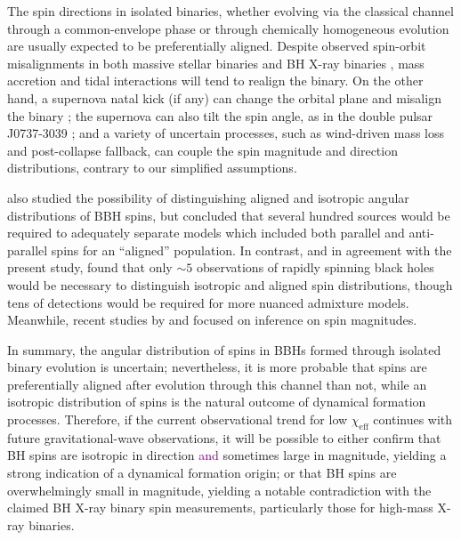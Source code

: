 \documentclass[modern,linenumbers]{aastex61}
\newcommand{\chieff}{\chi_\mathrm{eff}}
\newcommand{\ilya}[1]{\textcolor{purple}{#1}}
\begin{document}
The spin directions in isolated binaries, whether evolving via the
classical channel through a common-envelope phase
\citep{TutukovYungelson:1973,TutukovYungelson:1993,Lipunov:1997,2016Natur.534..512B,Stevenson:2017}
or through chemically homogeneous evolution
\citep{MandeldeMink:2016,Marchant:2016} are usually expected to be
preferentially aligned.  Despite observed spin-orbit misalignments in
both massive stellar binaries
\citep{Albrecht:2009,2014ApJ...785...83A} and BH X-ray binaries
\citep{Orosz:2001,Martin:2008b,Martin:2008,MorningstarMiller:2014},
mass accretion and tidal interactions will tend to realign the binary.
On the other hand, a supernova natal kick (if any) can change the
orbital plane and misalign the binary
\citep{2000ApJ...541..319K,2013PhRvD..87j4028G}; the supernova can
also tilt the spin angle, as in the double pulsar J0737-3039
\citep{2011ApJ...742...81F}; and a variety of uncertain processes,
such as wind-driven mass loss and post-collapse fallback, can couple
the spin magnitude and direction distributions, contrary to our
simplified assumptions.

\citet{2017CQGra..34cLT01V} also studied the possibility of
distinguishing aligned and isotropic angular distributions of \ac{BBH}
spins, but concluded that several hundred sources would be required to
adequately separate models which included both parallel and
anti-parallel spins for an ``aligned'' population.  In contrast, and
in agreement with the present study, \citet{Stevenson:2017spin} found
that only $\sim 5$ observations of rapidly spinning black holes would
be necessary to distinguish isotropic and aligned spin distributions,
though tens of detections would be required for more nuanced admixture
models.  Meanwhile, recent studies by
\citet{2017arXiv170306869F} and \citet{2017arXiv170306223G} focused on inference
on spin magnitudes.

In summary, the angular distribution of spins in \acp{BBH} formed
through isolated binary evolution is uncertain; nevertheless, it is
more probable that spins are preferentially aligned after evolution
through this channel than not, while an isotropic distribution of
spins is the natural outcome of dynamical formation processes.
Therefore, if the current observational trend for low $\chieff$
continues with future gravitational-wave observations, it will be
possible to either confirm that \ac{BH} spins are isotropic in direction \ilya{and} sometimes large in
magnitude, yielding a strong indication of
a dynamical formation origin; or that \ac{BH} spins are overwhelmingly
small in magnitude, yielding a notable contradiction with the claimed
\ac{BH} X-ray binary spin measurements, particularly those for high-mass X-ray
binaries.  
\end{document}
